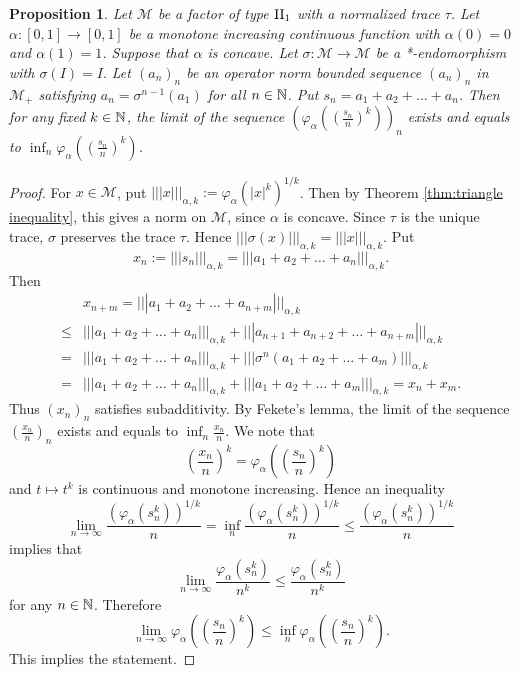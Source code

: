 \documentclass[a4paper,12pt]{amsart}
\newtheorem{proposition}[definition]{Proposition}
\newcommand{\M}{\mathcal{M}}
\begin{document}
\begin{proposition} 
Let $\M$ be a factor of type ${\rm II}_1$ with a normalized trace $\tau$.  
Let $\alpha: [0,1]  \rightarrow [0, 1]$ be a monotone increasing continuous function with $\alpha(0) = 0$ 
and $\alpha(1) = 1$.  
Suppose that $\alpha$ is concave.  
Let $\sigma: \M \rightarrow \M$ be a *-endomorphism with $\sigma(I) = I.$
Let $(a_n)_n$ be an operator norm bounded sequence $(a_n)_n$ in ${\M}_+$ satisfying 
$a_n = \sigma^{n-1}(a_1)$ for all $n \in {\Bbb N}$. 
Put $s_n = a_1 + a_2 + \dots +a_n$.
Then for any fixed $k \in {\Bbb N}$, the limit of the sequence $(\varphi_{\alpha}((\frac{s_n}{n})^k))_n$ exists 
and equals to  $\inf_n  \varphi_{\alpha}((\frac{s_n}{n})^k)$.
\end{proposition}
\begin{proof} For $x \in \M$, put $|||x|||_{\alpha,k}:= \varphi_\alpha(|x|^k)^{1/k} $.  Then by 
Theorem \ref{thm:triangle inequality}, this gives a norm on $\M$, since $\alpha$ is concave. 
Since $\tau$ is the unique trace, $\sigma$ preserves the trace $\tau$. Hence 
$|||\sigma(x)|||_{\alpha,k} = |||x|||_{\alpha,k}.$ 
Put 
$$
x_n := |||s_n|||_{\alpha,k} = |||a_1 + a_2 + \dots +a_n|||_{\alpha,k} .
$$
Then 
\begin{align*}
     & x_{n+m}  = |||a_1 + a_2 + \dots +a_{n+m}|||_{\alpha,k} \\
   \leq & |||a_1 + a_2 + \dots +a_n|||_{\alpha,k} + |||a_{n+1} + a_{n+2} + \dots +a_{n+m}|||_{\alpha,k} \\
   = & |||a_1 + a_2 + \dots +a_n|||_{\alpha,k} + |||\sigma^n(a_1 + a_2 + \dots +a_m)|||_{\alpha,k} \\
   = & |||a_1 + a_2 + \dots +a_n|||_{\alpha,k} + |||a_1 + a_2 + \dots +a_m|||_{\alpha,k} = x_n + x_m.
\end{align*}
Thus $(x_n)_n$ satisfies subadditivity. By Fekete's lemma, the limit of the sequence $(\frac{x_n}{n})_n$ exists 
and  equals to  $\inf_n  \frac{x_n}{n}$. 
We note that 
$$
(\frac{x_n}{n})^k =  \varphi_{\alpha}((\frac{s_n}{n})^k) 
$$
and  $t \mapsto t^k$ is continuous and monotone increasing.  
Hence an inequality
$$
\lim_{n \to \infty} \frac{(\varphi_{\alpha}(s_n^k))^{1/k}}{n} 
= \inf_n \frac{(\varphi_{\alpha}(s_n^k))^{1/k}}{n} 
\leq  \frac{(\varphi_{\alpha}(s_n^k))^{1/k}}{n}
$$
implies that 
$$
\lim_{n \to \infty} \frac{\varphi_{\alpha}(s_n^k)}{n^k}
 \leq  \frac{ \varphi_{\alpha}(s_n^k)}{n^k}
$$
for any $n \in {\Bbb N}$.  Therefore 
$$
\lim_{n \to \infty} \varphi_{\alpha}((\frac{s_n}{n})^k)
 \leq  \inf_n  \varphi_{\alpha}((\frac{s_n}{n})^k).
$$
This implies the statement.
\end{proof}
 
\end{document}
